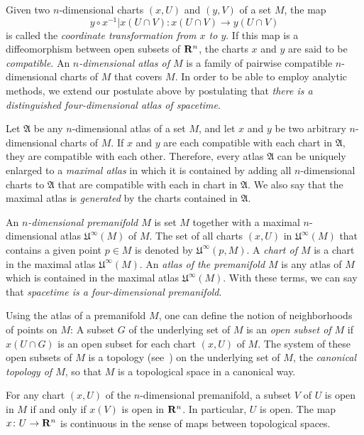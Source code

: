 Given two $n$-dimensional charts $(x, U)$ and $(y, V)$ of a set $M$, the map
\[
  y \circ x^{-1}|x(U \cap V)\colon x(U \cap V) \to y(U \cap V)
\]
is called the
\emph{coordinate transformation from $x$ to $y$}. If this map is a diffeomorphism
between open subsets of $\mathbf{R}^n$, the charts $x$ and $y$ are said to be
\emph{compatible}.
An \emph{$n$-dimensional atlas of $M$} is a family of pairwise compatible
$n$-dimensional charts of $M$ that covers $M$. In order to be able to employ 
analytic methods, we extend our postulate above by postulating that
\emph{there is a distinguished four-dimensional atlas of spacetime}.

Let $\mathfrak A$ be any $n$-dimensional atlas of a set $M$, and let $x$ and $y$
be two arbitrary $n$-dimensional charts of $M$. If $x$ and $y$ are each compatible
with each chart in $\mathfrak A$, they are compatible with each other. Therefore,
every atlas $\mathfrak A$ can be uniquely enlarged to a \emph{maximal atlas} in
which it is contained by adding all $n$-dimensional charts to $\mathfrak A$ that
are compatible with each in chart in $\mathfrak A$. We also say that the maximal
atlas is \emph{generated} by the charts contained in $\mathfrak A$.

An \emph{$n$-dimensional premanifold $M$} is set $M$ together
with a maximal $n$-dimensional atlas $\mathfrak U^\infty(M)$ of $M$. The set of
all charts $(x, U)$ in $\mathfrak U^\infty(M)$ that contains a given point $p \in M$ is 
denoted by $\mathfrak U^\infty(p, M)$. A \emph{chart of $M$} is a chart in the
maximal atlas $\mathfrak U^\infty(M)$.
An \emph{atlas of the premanifold $M$} is any atlas of $M$ which is contained in
the maximal atlas $\mathfrak U^\infty(M)$. With these terms, we can say that
\emph{spacetime is a four-dimensional premanifold}.

Using the atlas of a premanifold $M$, one can define the notion of neighborhoods
of points on $M$: A subset $G$ of the underlying set of $M$ is an \emph{open subset
of $M$} if $x(U \cap G)$ is an open subset for each chart $(x, U)$ of $M$. The
system of these open subsets of $M$ is a topology (see~)
on the underlying set of $M$, the \emph{canonical topology of $M$}, so that $M$
is a topological space in a canonical way.

For any chart $(x, U)$ of the $n$-dimensional premanifold, a subset $V$ of $U$
is open in $M$ if and only if $x(V)$ is open in $\mathbf{R}^n$. In particular, $U$ is open.
The map $x\colon U \to \mathbf{R}^n$ is continuous in the sense of maps between
topological spaces.

